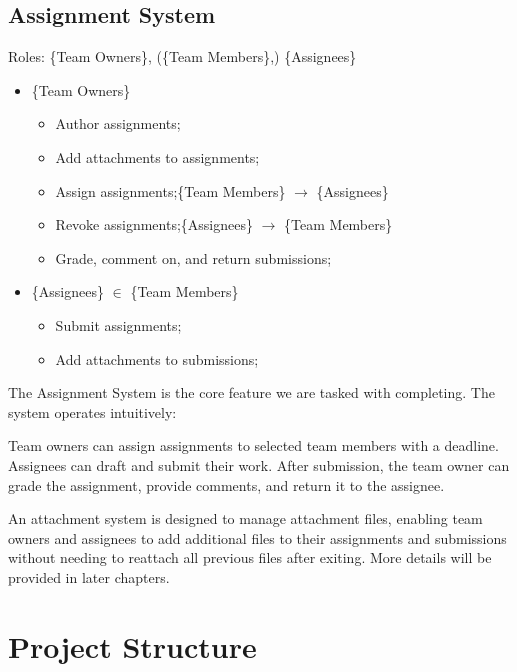 \documentclass[12pt]{report}
\newcommand{\n}{\par}
\newcommand{\br}{\vspace{1 em}\n}
\begin{document}
\subsection{Assignment System} \label{overview.project-objectives.assignment-system}
Roles: \{Team Owners\}, (\{Team Members\},) \{Assignees\}\n
\begin{itemize}
	\item \{Team Owners\}
	      \begin{itemize}
		      \item Author assignments;
		      \item Add attachments to assignments;
		      \item Assign assignments;\null\hfill \{Team Members\} $\rightarrow$ \{Assignees\}
		      \item Revoke assignments;\null\hfill \{Assignees\} $\rightarrow$ \{Team Members\}
		      \item Grade, comment on, and return submissions;
	      \end{itemize}
	\item \{Assignees\} $\in$ \{Team Members\}
	      \begin{itemize}
		      \item Submit assignments;
		      \item Add attachments to submissions;
	      \end{itemize}
\end{itemize}\n
The Assignment System is the core feature we are tasked with completing. The system operates intuitively:\n
Team owners can assign assignments to selected team members with a deadline.
Assignees can draft and submit their work.
After submission, the team owner can grade the assignment, provide comments, and return it to the assignee.
\br
An attachment system is designed to manage attachment files,
enabling team owners and assignees to add additional files to their assignments and submissions without needing to reattach all previous files after exiting.
More details will be provided in later chapters.
\section{Project Structure} \label{overview.project-structure}
\end{document}
